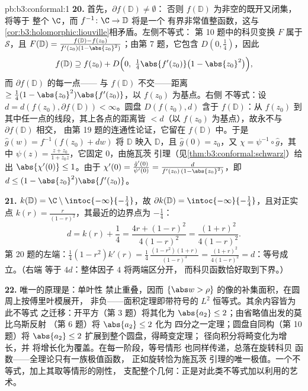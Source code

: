 \begin{solution}{pb:b3:conformal:1}
\textbf{20.} 首先，$\partial f(\mathbb D) \neq \emptyset$：
否则 $f(\mathbb D)$ 为非空的既开又闭集，将等于
整个 $\C$，而 $f^{-1} \colon \C \to \mathbb D$ 将是一个
有界非常值整函数，这与
\cref{cor:b3:holomorphic:liouville}相矛盾。左侧不等式：
第 10 题中的科贝变换 $F$ 属于 $\mathcal S$，且
$F(\mathbb D) = \frac{f(\mathbb D) -
f(z_0)}{f'(z_0)(1-\abs{z_0}^2)}$；由第 7 题，它包含
$D(0, \frac14)$，因此
\[
f(\mathbb D) \supseteq f(z_0) + D\Bigl(0,\
\tfrac14\abs{f'(z_0)}\bigl(1 - \abs{z_0}^2\bigr)\Bigr) ,
\]
而 $\partial f(\mathbb D)$ 的每一点——
与 $f(\mathbb D)$ 不交——距离 $\geq
\frac14(1-\abs{z_0}^2)\abs{f'(z_0)}$，以 $f(z_0)$ 为基点。右侧
不等式：设 $d = d(f(z_0), \partial f(\mathbb D)) <
\infty$。圆盘 $D(f(z_0), d)$ 含于 $f(\mathbb D)$：从
$f(z_0)$ 到其中任一点的线段，其上各点的距离皆
$< d$（以 $f(z_0)$ 为基点），故永不与 $\partial f(\mathbb D)$ 相交，
由第 19 题的连通性论证，它留在
$f(\mathbb D)$ 中。于是 $\hat g(w) = f^{-1}(f(z_0) + dw)$ 将
$\mathbb D$ 映入 $\mathbb D$，且 $\hat g(0) = z_0$，又
$\chi = \psi^{-1}\circ\hat g$，其中 $\psi(z) = \frac{z +
z_0}{1 + \bar z_0z}$，它固定 $0$，由施瓦茨
引理（见\cref{thm:b3:conformal:schwarz}）给出 $\abs{\chi'(0)}
\leq 1$。由于 $\chi'(0) = \frac{\hat g'(0)}{\psi'(0)} =
\frac{d}{f'(z_0)\,(1 - \abs{z_0}^2)}$，即 $d \leq (1 -
\abs{z_0}^2)\abs{f'(z_0)}$。

\textbf{21.} $k(\mathbb D) = \C\setminus
\intoc{-\infty}{-\frac14}$，故 $\partial k(\mathbb D) =
\intoc{-\infty}{-\frac14}$，且对正实点
$k(r) = \frac r{(1-r)^2}$，其最近的边界点为
$-\frac14$：
\[
d = k(r) + \frac14 = \frac{4r + (1-r)^2}{4(1-r)^2}
= \frac{(1+r)^2}{4(1-r)^2} .
\]
第 20 题的左端：$\frac14(1 - r^2)k'(r) =
\frac14\,\frac{(1-r^2)(1+r)}{(1-r)^3} =
\frac{(1+r)^2}{4(1-r)^2} = d$：等号成立。（右端
等于 $4d$：整体因子 $4$ 将两端区分开，
而科贝函数恰好取到下界。）

\textbf{22.} 唯一的原理是：单叶性
禁止重叠，因而
$\{\abs w > \rho\}$ 的像的补集面积，在圆周上按傅里叶模展开，
非负——面积定理即带符号的 $L^2$
恒等式。其余内容皆为此不等式
之迁移：开平方（第 3 题）将其化为
$\abs{a_2} \leq 2$；由省略值出发的莫比乌斯反射
（第 6 题）将 $\abs{a_2} \leq 2$ 化为
四分之一定理；圆盘自同构（第 10 题）将 $\abs{a_2}
\leq 2$ 扩展到整个圆盘，得畸变定理；
径向积分将畸变化为增长，并
将增长化为覆盖。在每一阶段，等号情形
也同样传递，总落在旋转科贝
函数——全理论只有一族极值函数，
正如旋转恰为施瓦茨
引理的唯一极值。一个不等式，加上其取等情形的刚性，
支配整个几何：正是对此类不等式加以利用的艺术。


\end{solution}
